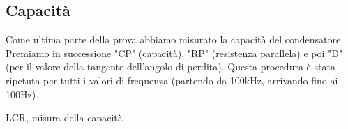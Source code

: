 \begin{table}
\centering
{}
\caption{Tabella di incertezza fornita dal costruttore, con Uz l'incertezza}
\label{tab:lcr_z_sheet}
\end{table}



\subsection{Capacità}
\label{sub:c}
Come ultima parte della prova abbiamo misurato la capacità del condensatore.
Premiamo in successione "CP" (capacità), "RP" (resistenza parallela) e poi "D" (per il valore della tangente dell'angolo di perdita). Questa procedura è stata ripetuta per tutti i valori di frequenza (partendo da 100kHz, arrivando fino ai 100Hz).


\begin{table}[ht]
\centering
\caption{LCR, misura della capacità}
\label{tab:lcr_c}
\end{table}




